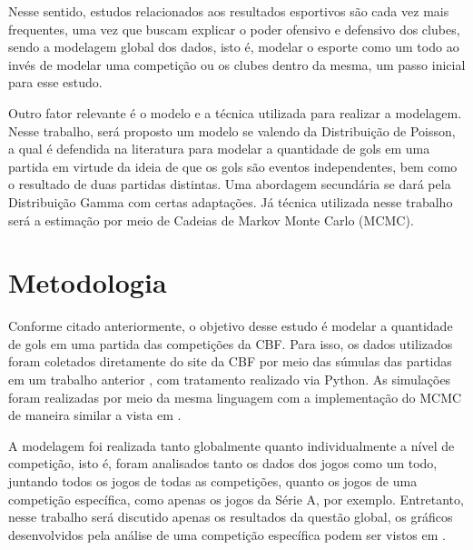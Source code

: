 \documentclass[11pt,letterpaper,twocolumn]{article}
\begin{document}
Nesse sentido, estudos relacionados aos resultados esportivos são cada vez mais frequentes, uma vez que buscam explicar o poder ofensivo e defensivo dos clubes, sendo a modelagem global dos dados, isto é, modelar o esporte como um todo ao invés de modelar uma competição ou os clubes dentro da mesma, um passo inicial para esse estudo.

Outro fator relevante é o modelo e a técnica utilizada para realizar a modelagem. Nesse trabalho, será proposto um modelo se valendo da Distribuição de Poisson, a qual é defendida na literatura para modelar a quantidade de gols em uma partida em virtude da ideia de que os gols são eventos independentes, bem como o resultado de duas partidas distintas. Uma abordagem secundária se dará pela Distribuição Gamma com certas adaptações. Já técnica utilizada nesse trabalho será a estimação por meio de Cadeias de Markov Monte Carlo (MCMC).


\section{Metodologia}
\justify

Conforme citado anteriormente, o objetivo desse estudo é modelar a quantidade de gols em uma partida das competições da CBF. Para isso, os dados utilizados foram coletados diretamente do site da CBF por meio das súmulas das partidas em um trabalho anterior \cite{partidas}, com tratamento realizado via Python. As simulações foram realizadas por meio da mesma linguagem com a implementação do MCMC de maneira similar a vista em \cite{mcmc}.

A modelagem foi realizada tanto globalmente quanto individualmente a nível de competição, isto é, foram analisados tanto os dados dos jogos como um todo, juntando todos os jogos de todas as competições, quanto os jogos de uma competição específica, como apenas os jogos da Série A, por exemplo. Entretanto, nesse trabalho será discutido apenas os resultados da questão global, os gráficos desenvolvidos pela análise de uma competição específica podem ser vistos em \cite{trabalho}.
\end{document}
